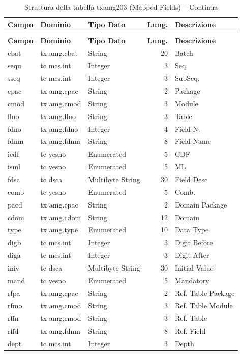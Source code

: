\begin{longtable}{@{} l l l r p{6cm} @{}}
\caption{Struttura della tabella txamg203 (Mapped Fields)} \label{tab:txamg203} \\
\toprule
\textbf{Campo} & \textbf{Dominio} & \textbf{Tipo Dato} & \textbf{Lung.} & \textbf{Descrizione} \\
\midrule
\endfirsthead
\caption[]{Struttura della tabella txamg203 (Mapped Fields) -- Continua} \\
\toprule
\textbf{Campo} & \textbf{Dominio} & \textbf{Tipo Dato} & \textbf{Lung.} & \textbf{Descrizione} \\
\midrule
\endhead
cbat & tx amg.cbat & String & 20 & Batch \\
sequ & tc mcs.int & Integer & 3 & Seq. \\
sseq & tc mcs.int & Integer & 3 & SubSeq. \\
cpac & tx amg.cpac & String & 2 & Package \\
cmod & tx amg.cmod & String & 3 & Module \\
flno & tx amg.flno & String & 3 & Table \\
fdno & tx amg.fdno & Integer & 4 & Field N. \\
fdnm & tx amg.fdnm & String & 8 & Field Name \\
icdf & tc yesno & Enumerated & 5 & CDF \\
isml & tc yesno & Enumerated & 5 & ML \\
fdsc & tc dsca & Multibyte String & 30 & Field Desc \\
comb & tc yesno & Enumerated & 5 & Comb. \\
pacd & tx amg.cpac & String & 2 & Domain Package \\
cdom & tx amg.cdom & String & 12 & Domain \\
type & tx amg.type & Enumerated & 10 & Data Type \\
digb & tc mcs.int & Integer & 3 & Digit Before \\
diga & tc mcs.int & Integer & 3 & Digit After \\
iniv & tc dsca & Multibyte String & 30 & Initial Value \\
mand & tc yesno & Enumerated & 5 & Mandatory \\
rfpa & tx amg.cpac & String & 2 & Ref. Table Package \\
rfmo & tx amg.cmod & String & 3 & Ref. Table Module \\
rffn & tx amg.cmod & String & 3 & Ref. Table \\
rffd & tx amg.fdnm & String & 8 & Ref. Field \\
dept & tc mcs.int & Integer & 3 & Depth \\
\end{longtable}

